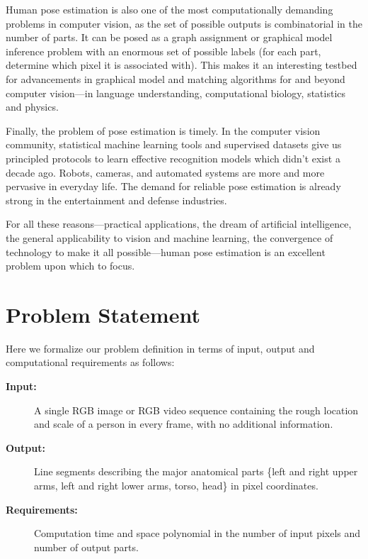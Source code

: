 Human pose estimation is also one of the most computationally demanding 
problems in computer vision, as the set of possible outputs is combinatorial in 
the number of parts.  It can be posed as a graph assignment or graphical model 
inference problem with an enormous set of possible labels (for each part, 
determine which pixel it is associated with).  This makes it an interesting 
testbed for advancements in graphical model and matching algorithms for and 
beyond computer vision---in language understanding, computational biology, 
statistics and physics.

Finally, the problem of pose estimation is timely.  In the computer vision 
community, statistical machine learning tools and supervised datasets give us 
principled protocols to learn effective recognition models which didn't exist a 
decade ago.  Robots, cameras, and automated systems are more and more pervasive 
in everyday life.  The demand for reliable pose estimation is already strong in 
the entertainment and defense industries. 

For all these reasons---practical applications, the dream of artificial 
intelligence, the general applicability to vision and machine learning, the 
convergence of technology to make it all possible---human pose estimation is an 
excellent problem upon which to focus.


\section{Problem Statement}

Here we formalize our problem definition in terms of input, output and 
computational requirements as follows:  


\begin{problem}
\label{prob:pose}
\hspace*{\fill}
\begin{description}
\item[\textbf{Input:}] A single RGB image or RGB video sequence containing the 
rough location and scale of a person in every frame, with no additional 
information.
\item[\textbf{Output:}] Line segments describing the major anatomical parts 
\{left and right upper arms, left and right lower arms, torso, head\} in pixel 
coordinates.
\item[\textbf{Requirements:}] Computation time and space polynomial in the 
number of input pixels and number of output parts.
\end{description}
\end{problem}

